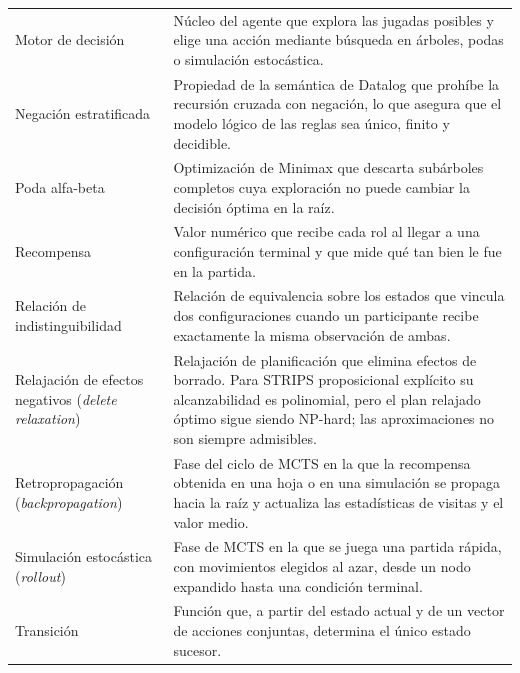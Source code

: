 \begin{longtable}[l]{
    @{}
    >{\raggedright\arraybackslash}p{4.2cm}
    p{\dimexpr\textwidth-4.2cm-2\tabcolsep\relax}
    @{}
    }
    Motor de decisión
                     &
    Núcleo del agente que explora las jugadas posibles y elige una acción mediante búsqueda en árboles, podas o simulación estocástica.
    \\

    Negación estratificada
                     &
    Propiedad de la semántica de Datalog que prohíbe la recursión cruzada con negación, lo que asegura que el modelo lógico de las reglas sea único, finito y decidible.
    \\

    Poda alfa-beta
                     &
    Optimización de Minimax que descarta subárboles completos cuya exploración no puede cambiar la decisión óptima en la raíz.
    \\

    Recompensa
                     &
    Valor numérico que recibe cada rol al llegar a una configuración terminal y que mide qué tan bien le fue en la partida.
    \\

    Relación de indistinguibilidad
                     &
    Relación de equivalencia sobre los estados que vincula dos configuraciones cuando un participante recibe exactamente la misma observación de ambas.
    \\

    Relajación de efectos negativos (\textit{delete relaxation})
                     &
    Relajación de planificación que elimina efectos de borrado. Para STRIPS proposicional explícito su alcanzabilidad es polinomial, pero el plan relajado óptimo sigue siendo NP-hard; las aproximaciones no son siempre admisibles.
    \\

    Retropropagación (\textit{backpropagation})
                     &
    Fase del ciclo de MCTS en la que la recompensa obtenida en una hoja o en una simulación se propaga hacia la raíz y actualiza las estadísticas de visitas y el valor medio.
    \\

    Simulación estocástica (\textit{rollout})
                     &
    Fase de MCTS en la que se juega una partida rápida, con movimientos elegidos al azar, desde un nodo expandido hasta una condición terminal.
    \\

    Transición
                     &
    Función que, a partir del estado actual y de un vector de acciones conjuntas, determina el único estado sucesor.
    \\

\end{longtable}

\endgroup
